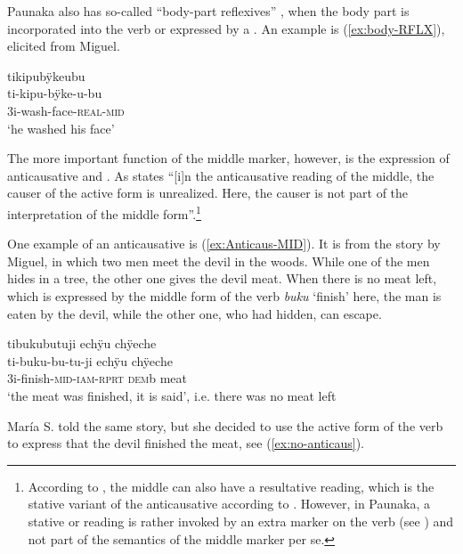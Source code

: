 Paunaka also has so-called “body-part reflexives” \citep[77]{Kemmer1993}, when the body part is incorporated into the verb or expressed by a . An example is (\ref{ex:body-RFLX}), elicited from Miguel.

\ea\label{ex:body-RFLX}
\begingl 
\glpreamble tikipubÿkeubu\\
\gla ti-kipu-bÿke-u-bu\\ 
\glb 3i-wash-face-\textsc{real}-\textsc{mid}\\ 
\glft ‘he washed his face’\\ 
\endgl
 \trailingcitation{[mdx-c120416ls.079]}
\xe
{}

The more important function of the middle marker, however, is the expression of anticausative and . As \citet[1682]{Kaufmann2007} states “[i]n the anticausative reading of the middle, the causer of the active form is unrealized. Here, the causer is not part of the interpretation of the middle form”.\footnote{According to \citet[1683]{Kaufmann2007}, the middle can also have a resultative reading, which is the stative variant of the anticausative according to \citet[1133]{HaspelmathMueller2004}. However, in Paunaka, a stative or  reading is rather invoked by an extra  marker on the verb (see ) and not part of the semantics of the middle marker per se.}

One example of an anticausative is (\ref{ex:Anticaus-MID}). It is from the story by Miguel, in which two men meet the devil in the woods. While one of the men hides in a tree, the other one gives the devil meat. When there is no meat left, which is expressed by the middle form of the verb \textit{buku} ‘finish’ here, the man is eaten by the devil, while the other one, who had hidden, can escape.

\ea\label{ex:Anticaus-MID}
\begingl 
\glpreamble tibukubutuji echÿu chÿeche\\
\gla ti-buku-bu-tu-ji echÿu chÿeche\\ 
\glb 3i-finish-\textsc{mid}-\textsc{iam}-\textsc{rprt} \textsc{dem}b meat\\ 
\glft ‘the meat was finished, it is said’, i.e. there was no meat left\\ 
\endgl
 \trailingcitation{[mxx-n101017s-1.044]}
\xe

María S. told the same story, but she decided to use the active form of the verb to express that the devil finished the meat, see (\ref{ex:no-anticaus}).


